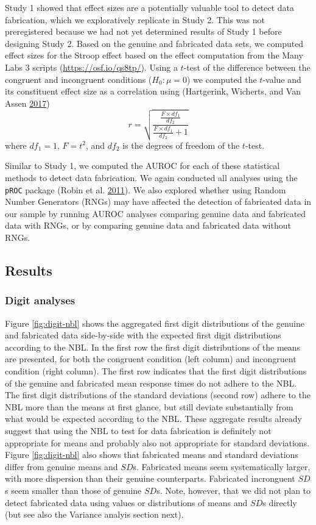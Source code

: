 \documentclass[a5paper]{book}
\begin{document}
Study 1 showed that effect sizes are a potentially valuable tool to
detect data fabrication, which we exploratively replicate in Study 2.
This was not preregistered because we had not yet determined results of
Study 1 before designing Study 2. Based on the genuine and fabricated
data sets, we computed effect sizes for the Stroop effect based on the
effect computation from the Many Labs 3 scripts
(\url{https://osf.io/qs8tp/}). Using a \(t\)-test of the difference
between the congruent and incongruent conditions (\(H_0:\mu=0\)) we
computed the \(t\)-value and its constituent effect size as a
correlation using (Hartgerink, Wicherts, and Van Assen
\protect\hyperlink{ref-doi:10.1525ux2fcollabra.71}{2017}) \[
r=\sqrt{\frac{\frac{F\times df_1}{df_2}}{\frac{F\times df_1}{df_2}+1}}
\] where \(df_1=1\), \(F=t^2\), and \(df_2\) is the degrees of freedom
of the \(t\)-test.

Similar to Study 1, we computed the AUROC for each of these statistical
methods to detect data fabrication. We again conducted all analyses
using the \texttt{pROC} package (Robin et al.
\protect\hyperlink{ref-doi:10.1186ux2f1471-2105-12-77}{2011}). We also
explored whether using Random Number Generators (RNGs) may have affected
the detection of fabricated data in our sample by running AUROC analyses
comparing genuine data and fabricated data with RNGs, or by comparing
genuine data and fabricated data without RNGs.

\subsection{Results}\label{results-4}

\subsubsection{Digit analyses}\label{digit-analyses}

Figure \ref{fig:digit-nbl} shows the aggregated first digit
distributions of the genuine and fabricated data side-by-side with the
expected first digit distributions according to the NBL. In the first
row the first digit distributions of the means are presented, for both
the congruent condition (left column) and incongruent condition (right
column). The first row indicates that the first digit distributions of
the genuine and fabricated mean response times do not adhere to the NBL.
The first digit distributions of the standard deviations (second row)
adhere to the NBL more than the means at first glance, but still deviate
substantially from what would be expected according to the NBL. These
aggregate results already suggest that using the NBL to test for data
fabrication is definitely not appropriate for means and probably also
not appropriate for standard deviations. Figure \ref{fig:digit-nbl} also
shows that fabricated means and standard deviations differ from genuine
means and \(SD\)s. Fabricated means seem systematically larger, with
more dispersion than their genuine counterparts. Fabricated incronguent
\(SD\)s seem smaller than those of genuine \(SD\)s. Note, however, that
we did not plan to detect fabricated data using values or distributions
of means and \(SD\)s directly (but see also the Variance analyis section
next).
\end{document}
